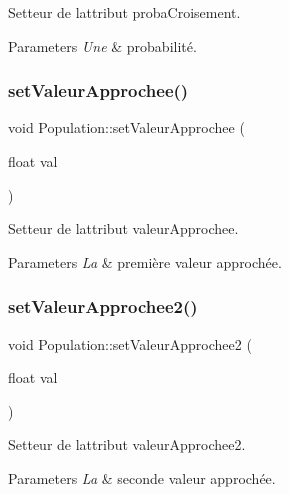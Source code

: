 Setteur de l\textquotesingle{}attribut proba\+Croisement. 


\begin{DoxyParams}{Parameters}
{\em Une} & probabilité. \\
\hline
\end{DoxyParams}
\mbox{\label{class_population_ad3e0a26ca7b57924bcbb7a57d86056e4}} 
\subsubsection{\texorpdfstring{set\+Valeur\+Approchee()}{setValeurApprochee()}}
{\footnotesize\ttfamily void Population\+::set\+Valeur\+Approchee (\begin{DoxyParamCaption}\item[{float}]{val }\end{DoxyParamCaption})}



Setteur de l\textquotesingle{}attribut valeur\+Approchee. 


\begin{DoxyParams}{Parameters}
{\em La} & première valeur approchée. \\
\hline
\end{DoxyParams}
\mbox{\label{class_population_aa5645305dfca65e640ed76da9f851137}} 
\subsubsection{\texorpdfstring{set\+Valeur\+Approchee2()}{setValeurApprochee2()}}
{\footnotesize\ttfamily void Population\+::set\+Valeur\+Approchee2 (\begin{DoxyParamCaption}\item[{float}]{val }\end{DoxyParamCaption})}



Setteur de l\textquotesingle{}attribut valeur\+Approchee2. 


\begin{DoxyParams}{Parameters}
{\em La} & seconde valeur approchée. \\
\hline
\end{DoxyParams}
\mbox{\label{class_population_afe14ed3d2919840291b623029eaaf8d3}} 
